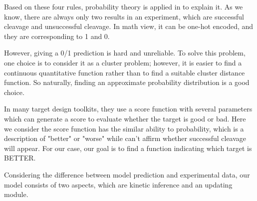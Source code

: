Based on these four rules, probability theory is applied in to explain it. As we know, there are always only two results in an experiment, which are successful cleavage and unsuccessful cleavage. In math view, it can be one-hot encoded, and they are corresponding to 1 and 0. 

However, giving a 0/1 prediction is hard and unreliable. To solve this problem, one choice is to consider it as a cluster problem; however, it is easier to find a continuous quantitative function rather than to find a suitable cluster distance function. So naturally, finding an approximate probability distribution is a good choice. 
	
In many target design toolkits, they use a score function with several parameters which can generate a score to evaluate whether the target is good or bad. Here we consider the score function has the similar ability to probability, which is a description of "better" or "worse" while can’t affirm whether successful cleavage will appear. For our case, our goal is to find a function indicating which target is BETTER.
	
Considering the difference between model prediction and experimental data, our model consists of two aspects, which are kinetic inference and an updating module.